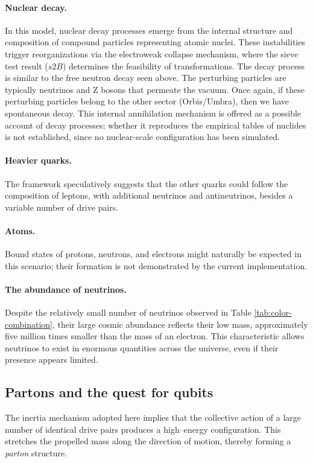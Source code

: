 \documentclass{ijuc}
\begin{document}
\paragraph{Nuclear decay.}
In this model, nuclear decay processes emerge from the internal structure and composition of compound particles representing atomic nuclei.
These instabilities trigger reorganizations via the electroweak collapse mechanism, where the sieve test result ($s2B$) determines the feasibility of transformations.
The decay process is similar to the free neutron decay seen above.
The perturbing particles are typically neutrinos and Z bosons that permeate the vacuum. Once again, if these perturbing particles belong to the other sector (Orbis/Umbra), then we have spontaneous decay.
This internal annihilation mechanism is offered as a possible account of decay processes; whether it reproduces the empirical tables of nuclides is not established, since no nuclear-scale configuration has been simulated.
\paragraph{Heavier quarks.}
The framework speculatively suggests that the other quarks could follow the composition of leptons, with additional neutrinos and antineutrinos, besides a variable number of drive pairs.
\paragraph{Atoms.}
Bound states of protons, neutrons, and electrons might naturally be expected in this scenario; their formation is not demonstrated by the current implementation.
\paragraph{The abundance of neutrinos.}
Despite the relatively small number of neutrinos observed in Table \ref{tab:color-combination}, their large cosmic abundance reflects their low mass, approximately five million times smaller than the mass of an electron.
This characteristic allows neutrinos to exist in enormous quantities across the universe, even if their presence appears limited.
\subsection{Partons and the quest for qubits}
The inertia mechanism adopted here implies that the collective action of a large number of identical drive pairs produces a high--energy configuration. This stretches the propelled mass along the direction of motion, thereby forming a \textit{parton} structure.
\end{document}
